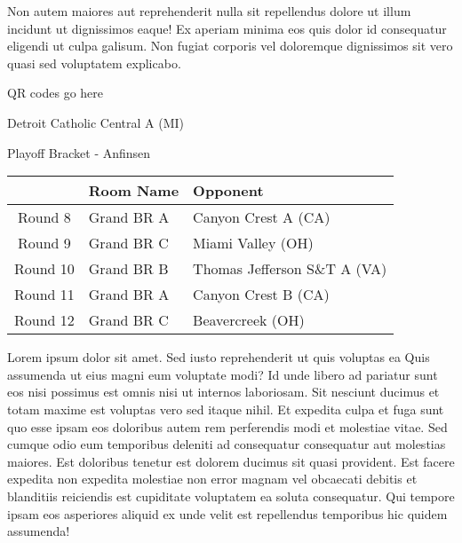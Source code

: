 \documentclass{article}%
\begin{document}
\newline%
Non autem maiores aut reprehenderit nulla sit repellendus dolore ut illum incidunt ut dignissimos eaque! Ex aperiam minima eos quis dolor id consequatur eligendi ut culpa galisum. Non fugiat corporis vel doloremque dignissimos sit vero quasi sed voluptatem explicabo.\newline%
\newline%
%
\vspace*{30pt}%
\begin{center}%
\begin{Huge}%
QR codes go here%
\end{Huge}%
\end{center}%
\newpage%
\begin{center}%
\begin{Huge}%
Detroit Catholic Central A (MI)%
\end{Huge}%
\vspace*{8pt}%
\linebreak%
\begin{Large}%
Playoff Bracket {-} Anfinsen%
\end{Large}%
\end{center}%
%
\begin{tabularx}{\textwidth}{|c|Y|Y|}%
\hline%
&Room Name&Opponent\\%
\hline%
Round 8&Grand BR A&Canyon Crest A (CA)\\%
Round 9&Grand BR C&Miami Valley (OH)\\%
Round 10&Grand BR B&Thomas Jefferson S\&T A (VA)\\%
Round 11&Grand BR A&Canyon Crest B (CA)\\%
Round 12&Grand BR C&Beavercreek (OH)\\%
\hline%
\end{tabularx}%
\vspace*{8pt}%
\linebreak%
\newline%
\newline%
Lorem ipsum dolor sit amet. Sed iusto reprehenderit ut quis voluptas ea Quis assumenda ut eius magni eum voluptate modi? Id unde libero ad pariatur sunt eos nisi possimus est omnis nisi ut internos laboriosam. Sit nesciunt ducimus et totam maxime est voluptas vero sed itaque nihil. Et expedita culpa et fuga sunt quo esse ipsam eos doloribus autem rem perferendis modi et molestiae vitae.\newline%
\newline%
Sed cumque odio eum temporibus deleniti ad consequatur consequatur aut molestias maiores. Est doloribus tenetur est dolorem ducimus sit quasi provident. Est facere expedita non expedita molestiae non error magnam vel obcaecati debitis et blanditiis reiciendis est cupiditate voluptatem ea soluta consequatur. Qui tempore ipsam eos asperiores aliquid ex unde velit est repellendus temporibus hic quidem assumenda!\newline%
\end{document}
